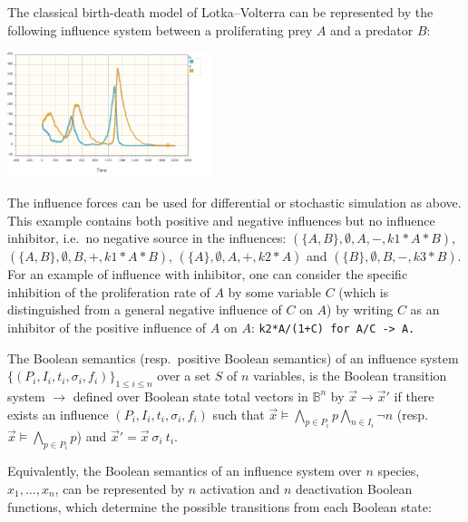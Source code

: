 \documentclass{llncs}
\newcommand{\lra}{\longrightarrow}
\begin{document}
\begin{example}\label{ex:LVi}
   The classical birth-death model of Lotka--Volterra can be represented by the following
influence system between a proliferating prey $A$ and a predator $B$:
  

\vspace{-2cm}\hfill\includegraphics[width=0.45\textwidth]{LVstoch.png}

The influence forces can be used for differential or stochastic simulation as above.
This example contains both positive and negative influences but no influence inhibitor, i.e.~no negative source in the influences:
$(\{A, B\}, \emptyset, A, -, k1*A*B)$, $(\{A, B\}, \emptyset, B, +, k1*A*B)$, $(\{A\}, \emptyset, A, +, k2*A)$ and $(\{B\}, \emptyset, B, -, k3*B)$.
For an example of influence with inhibitor, one can consider the specific inhibition of the proliferation rate of $A$ by some variable $C$
(which is distinguished from a general negative influence of $C$ on $A$) by writing $C$ as an inhibitor of the positive influence of $A$ on $A$:
\verb|k2*A/(1+C) for A/C -> A.|
\end{example}



\begin{definition}
   The Boolean semantics (resp.~positive Boolean semantics) of an influence system $\{(P_i, I_i, t_i, \sigma_i,
   f_i)\}_{1\leq i\leq n}$
   over a set $S$ of $n$ variables,
   is the Boolean transition system $\lra$ defined over Boolean state total vectors in $\mathbb{B}^n$
   by
   ${\vec x}\lra{\vec x'}$ if there exists an influence $(P_i, I_i, t_i, \sigma_i, f_i)$
   such that ${\vec x}\models \bigwedge_{p\in P_i} p\bigwedge_{n\in I_i} \neg n$ (resp.~${\vec x}\models \bigwedge_{p\in P_i} p$)
   and ${\vec x'} = {\vec x}\ \sigma_i\ t_i$.
\end{definition}


Equivalently, the Boolean semantics of an influence system over $n$ species, $x_1,\ldots,x_n$,
can be represented by $n$ activation and $n$ deactivation Boolean functions, 
 which determine the possible transitions from each Boolean state:
\end{document}
